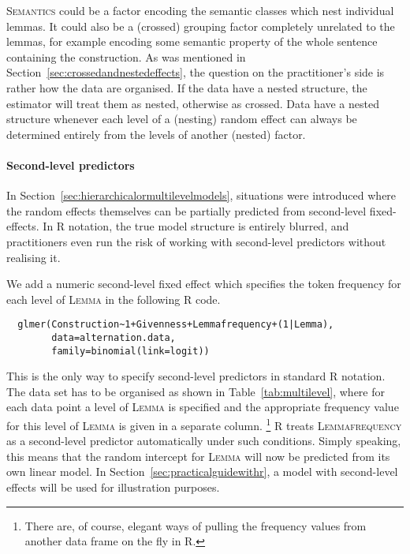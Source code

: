 \textsc{Semantics} could be a factor encoding the semantic classes which nest individual lemmas.
It could also be a (crossed) grouping factor completely unrelated to the lemmas, for example encoding some semantic property of the whole sentence containing the construction.
As was mentioned in Section~\ref{sec:crossedandnestedeffects}, the question on the practitioner's side is rather how the data are organised.
If the data have a nested structure, the estimator will treat them as nested, otherwise as crossed.
Data have a nested structure whenever each level of a (nesting) random effect can always be determined entirely from the levels of another (nested) factor.


\paragraph{Second-level predictors}

In Section~\ref{sec:hierarchicalormultilevelmodels}, situations were introduced where the random effects themselves can be partially predicted from second-level fixed-effects.
In R notation, the true model structure is entirely blurred, and practitioners even run the risk of working with second-level predictors without realising it.

We add a numeric second-level fixed effect which specifies the token frequency for each level of \textsc{Lemma} in the following R code.

\begin{lstlisting}
  glmer(Construction~1+Givenness+Lemmafrequency+(1|Lemma),
        data=alternation.data,
        family=binomial(link=logit))
\end{lstlisting}

This is the only way to specify second-level predictors in standard R notation.
The data set has to be organised as shown in Table~\ref{tab:multilevel}, where for each data point a level of \textsc{Lemma} is specified and the appropriate frequency value for this level of \textsc{Lemma} is given in a separate column.%
\footnote{There are, of course, elegant ways of pulling the frequency values from another data frame on the fly in R.}
R treats \textsc{Lemmafrequency} as a second-level predictor automatically under such conditions.
Simply speaking, this means that the random intercept for \textsc{Lemma} will now be predicted from its own linear model.
In Section~\ref{sec:practicalguidewithr}, a model with second-level effects will be used for illustration purposes.



